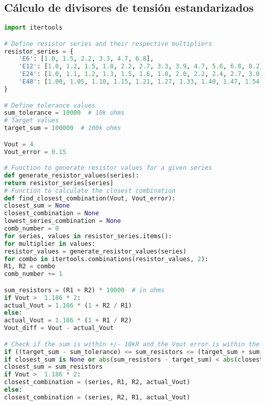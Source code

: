 \subsection{Cálculo de divisores de tensión estandarizados}

\begin{lstlisting}[language=Python, basicstyle=\ttfamily\small, breaklines=true, frame=single]
import itertools

# Define resistor series and their respective multipliers
resistor_series = {
	'E6': [1.0, 1.5, 2.2, 3.3, 4.7, 6.8],
	'E12': [1.0, 1.2, 1.5, 1.8, 2.2, 2.7, 3.3, 3.9, 4.7, 5.6, 6.8, 8.2],
	'E24': [1.0, 1.1, 1.2, 1.3, 1.5, 1.6, 1.8, 2.0, 2.2, 2.4, 2.7, 3.0, 3.3, 3.6, 3.9, 4.3, 4.7, 5.1, 5.6, 6.2, 6.8, 7.5, 8.2, 9.1],
	'E48': [1.00, 1.05, 1.10, 1.15, 1.21, 1.27, 1.33, 1.40, 1.47, 1.54, 1.62, 1.69, 1.78, 1.87, 1.96, 2.05, 2.15, 2.26, 2.37, 2.49, 2.61, 2.74, 2.87, 3.01, 3.16, 3.32, 3.48, 3.65, 3.83, 4.02, 4.22, 4.42, 4.64, 4.87, 5.11, 5.36, 5.62, 5.90, 6.19, 6.49, 6.81, 7.15, 7.50, 7.87, 8.25, 8.66, 9.09],
}

# Define tolerance values
sum_tolerance = 10000  # 10k ohms
# Target values
target_sum = 100000  # 100k ohms

Vout = 4
Vout_error = 0.15

# Function to generate resistor values for a given series
def generate_resistor_values(series):
return resistor_series[series]
# Function to calculate the closest combination
def find_closest_combination(Vout, Vout_error):
closest_sum = None
closest_combination = None
lowest_series_combination = None
comb_number = 0
for series, values in resistor_series.items():
for multiplier in values:
resistor_values = generate_resistor_values(series)
for combo in itertools.combinations(resistor_values, 2):
R1, R2 = combo
comb_number += 1

sum_resistors = (R1 + R2) * 10000  # in ohms
if Vout >  1.186 * 2:
actual_Vout = 1.186 * (1 + R2 / R1)
else:
actual_Vout = 1.186 * (1 + R1 / R2)
Vout_diff = Vout - actual_Vout

# Check if the sum is within +/- 10kR and the Vout error is within the specified tolerance
if ((target_sum - sum_tolerance) <= sum_resistors <= (target_sum + sum_tolerance)) and (Vout_diff <= Vout_error and Vout_diff > 0):
if closest_sum is None or abs(sum_resistors - target_sum) < abs(closest_sum - target_sum):
closest_sum = sum_resistors
if Vout >  1.186 * 2:
closest_combination = (series, R1, R2, actual_Vout)
else:
closest_combination = (series, R2, R1, actual_Vout)


\end{lstlisting}
